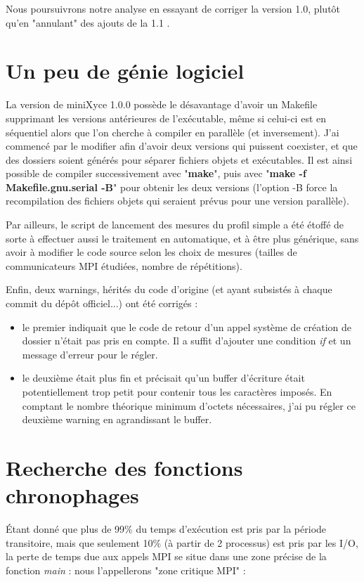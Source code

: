 \documentclass[11pt,a4paper,oneside]{memoir}
\theoremstyle{definition}
\theoremstyle{remark}
\theoremstyle{plain}
\begin{document}
Nous poursuivrons notre analyse en essayant de corriger la version 1.0, plutôt qu'en "annulant" des ajouts de la 1.1 .






\section{Un peu de génie logiciel}

La version de miniXyce 1.0.0 possède le désavantage d'avoir un Makefile supprimant les versions antérieures de l'exécutable, même si celui-ci est en séquentiel alors que l'on cherche à compiler en parallèle (et inversement). J'ai commencé par le modifier afin d'avoir deux versions qui puissent coexister, et que des dossiers soient générés pour séparer fichiers objets et exécutables. Il est ainsi possible de compiler successivement avec "\textbf{make}", puis avec "\textbf{make -f Makefile.gnu.serial -B}" pour obtenir les deux versions (l'option -B force la recompilation des fichiers objets qui seraient prévus pour une version parallèle).

Par ailleurs, le script de lancement des mesures du profil simple a été étoffé de sorte à effectuer aussi le traitement en automatique, et à être plus générique, sans avoir à modifier le code source selon les choix de mesures (tailles de communicateurs MPI étudiées, nombre de répétitions).

Enfin, deux warnings, hérités du code d'origine (et ayant subsistés à chaque commit du dépôt officiel...) ont été corrigés : 
\begin{itemize}
\item le premier indiquait que le code de retour d'un appel système de création de dossier n'était pas pris en compte. Il a suffit d'ajouter une condition \textit{if} et un message d'erreur pour le régler.
\item le deuxième était plus fin et précisait qu'un buffer d'écriture était potentiellement trop petit pour contenir tous les caractères imposés. En comptant le nombre théorique minimum d'octets nécessaires, j'ai pu régler ce deuxième warning en agrandissant le buffer.
\end{itemize}


\section{Recherche des fonctions chronophages}

\'Etant donné que plus de 99\% du temps d'exécution est pris par la période transitoire, mais que seulement 10\% (à partir de 2 processus) est pris par les I/O, la perte de temps due aux appels MPI se situe dans une zone précise de la fonction \textit{main} : nous l'appellerons "zone critique MPI" :
\end{document}
